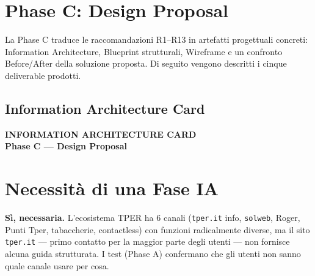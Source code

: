 ﻿\documentclass[11pt,a4paper]{article}
\begin{document}
\newpage
\section{Phase C: Design Proposal}

La Phase C traduce le raccomandazioni R1--R13 in artefatti progettuali concreti: Information Architecture, Blueprint strutturali, Wireframe e un confronto Before/After della soluzione proposta. Di seguito vengono descritti i cinque deliverable prodotti.

\vspace{0.3cm}

\subsection{Information Architecture Card}


\begin{tcolorbox}[headerbox]
 \color{white}\LARGE\bfseries\sffamily INFORMATION ARCHITECTURE CARD \\[0.1cm]
 \color{white!80}\small\sffamily Phase C --- Design Proposal
\end{tcolorbox}

\vspace{0.3cm}

\section{Necessit\`a di una Fase IA}

\begin{tcolorbox}[rffield]
\small\textbf{S\`i, necessaria.} L'ecosistema TPER ha 6 canali (\texttt{tper.it} info, \texttt{solweb}, Roger, Punti Tper, tabaccherie, contactless) con funzioni radicalmente diverse, ma il sito \texttt{tper.it} --- primo contatto per la maggior parte degli utenti --- non fornisce alcuna guida strutturata. I test (Phase A) confermano che gli utenti non sanno quale canale usare per cosa.
\end{tcolorbox}

\end{document}
